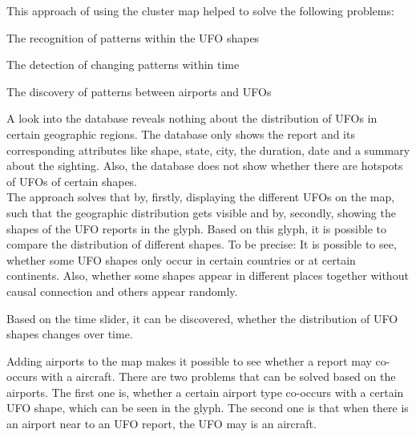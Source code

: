 \documentclass{article}
\begin{document}
This approach of using the cluster map helped to solve the following problems:
\begin{compactenum}[1.]
\item The recognition of patterns within the UFO shapes
\item The detection of changing patterns within time
\item The discovery of patterns between airports and UFOs
\end{compactenum}
\begin{compactenum}[1.]
\item A look into the database reveals nothing about the distribution of UFOs in certain geographic regions. The database only shows the report and its corresponding attributes like shape, state, city, the duration, date and a summary about the sighting. Also, the database does not show whether there are hotspots of UFOs of certain shapes.\\
The approach solves that by, firstly, displaying the different UFOs on the map, such that the geographic distribution gets visible and by, secondly, showing the shapes of the UFO reports in the glyph. Based on this glyph, it is possible to compare the distribution of different shapes. To be precise: It is possible to see, whether some UFO shapes only occur in certain countries or at certain continents. Also, whether some shapes appear in different places together without causal connection and others appear randomly.
\item Based on the time slider, it can be discovered, whether the distribution of UFO shapes changes over time.
\item Adding airports to the map makes it possible to see whether a report may co-occurs with a aircraft. There are two problems that can be solved based on the airports. The first one is, whether a certain airport type co-occurs with a certain UFO shape, which can be seen in the glyph. The second one is that when there is an airport near to an UFO report, the UFO may is an aircraft.
\end{compactenum}
\end{document}
